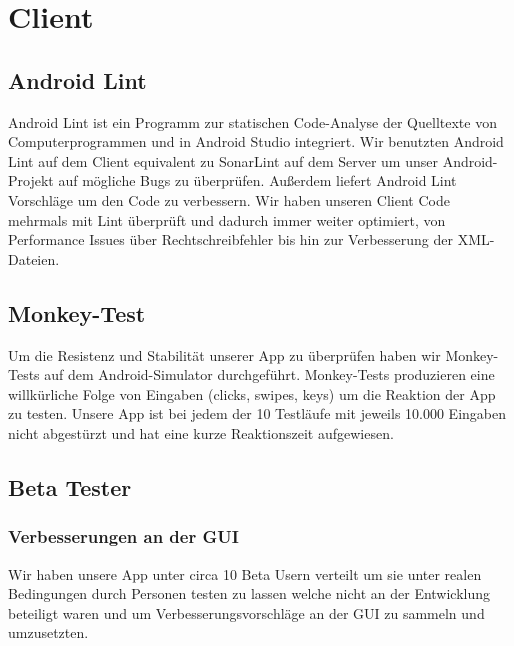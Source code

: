\documentclass{scrartcl}
\begin{document}
\begin{center}
\end{center}
\newpage
\section{Client}
	\subsection{Android Lint}
	Android Lint ist ein Programm zur statischen Code-Analyse der Quelltexte von Computerprogrammen und in Android Studio integriert. Wir benutzten Android Lint auf dem Client equivalent zu SonarLint auf dem Server um unser Android-Projekt auf mögliche Bugs zu überprüfen. Außerdem liefert Android Lint Vorschläge um den Code zu verbessern.
Wir haben unseren Client Code mehrmals mit Lint überprüft und dadurch immer weiter optimiert, von Performance Issues über Rechtschreibfehler bis hin zur Verbesserung der XML-Dateien.  


		\subsection{Monkey-Test}
Um die Resistenz und Stabilität unserer App zu überprüfen haben wir Monkey-Tests auf dem Android-Simulator durchgeführt.
Monkey-Tests produzieren eine willkürliche Folge von Eingaben (clicks, swipes, keys) um die Reaktion der App zu testen.
Unsere App ist bei jedem der 10 Testläufe mit jeweils 10.000 Eingaben nicht abgestürzt und hat eine kurze Reaktionszeit aufgewiesen.

		\subsection{Beta Tester}
		\subsubsection{Verbesserungen an der GUI}
Wir haben unsere App unter circa 10 Beta Usern verteilt um sie unter realen Bedingungen durch Personen testen zu lassen welche nicht an der Entwicklung beteiligt waren und um Verbesserungsvorschläge an der GUI zu sammeln und umzusetzten.
		
\end{document}
